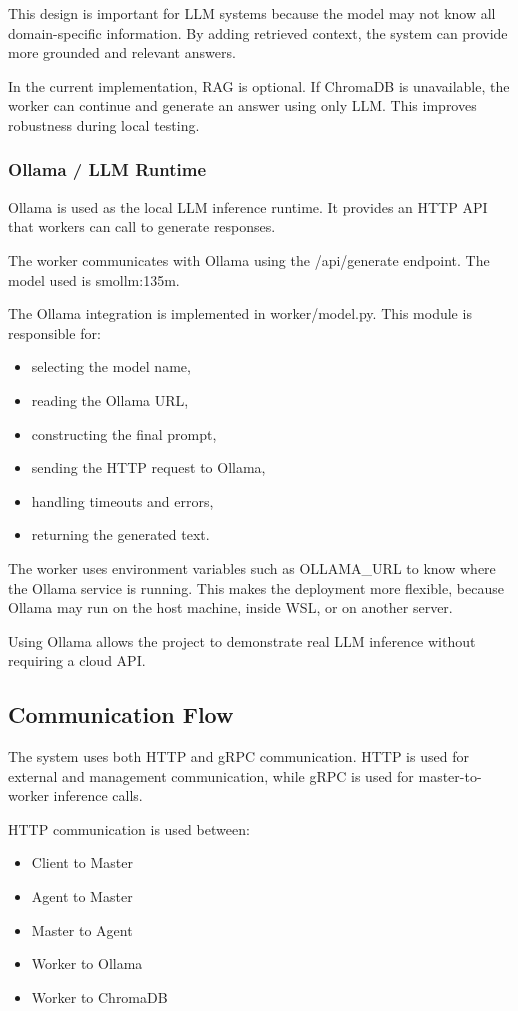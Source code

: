 This design is important for LLM systems because the model may not know all domain-specific information. By adding retrieved context, the system can provide more grounded and relevant answers.

In the current implementation, RAG is optional. If ChromaDB is unavailable, the worker can continue and generate an answer using only LLM. This improves robustness during local testing.

\subsubsection{Ollama / LLM Runtime}
Ollama is used as the local LLM inference runtime. It provides an HTTP API that workers can call to generate responses.

The worker communicates with Ollama using the /api/generate endpoint. The model used is smollm:135m.

The Ollama integration is implemented in worker/model.py. This module is responsible for:
\begin{itemize}[leftmargin=1.5em]
  \item selecting the model name,
  \item reading the Ollama URL,
  \item constructing the final prompt,
  \item sending the HTTP request to Ollama,
  \item handling timeouts and errors,
  \item returning the generated text.
\end{itemize}

The worker uses environment variables such as OLLAMA_URL to know where the Ollama service is running. This makes the deployment more flexible, because Ollama may run on the host machine, inside WSL, or on another server.

Using Ollama allows the project to demonstrate real LLM inference without requiring a cloud API.

\subsection{Communication Flow}
The system uses both HTTP and gRPC communication. HTTP is used for external and management communication, while gRPC is used for master-to-worker inference calls.

HTTP communication is used between:
\begin{itemize}[leftmargin=1.5em]
  \item Client to Master
  \item Agent to Master
  \item Master to Agent
  \item Worker to Ollama
  \item Worker to ChromaDB
\end{itemize}

